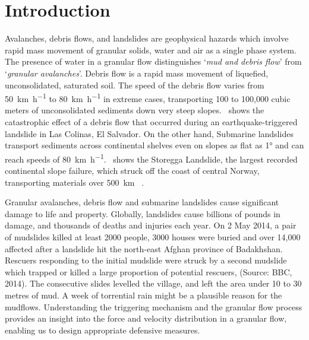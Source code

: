\chapter{Introduction}

\ifpdf
    \graphicspath{{Chapter1/figs/raster/}{Chapter1/figs/pdf/}{Chapter1/figs/}}
\else
    \graphicspath{{Chapter1/figs/vector/}{Chapter1/figs/}}
\fi

Avalanches, debris flows, and landslides are geophysical hazards which involve 
rapid mass movement of granular solids, water and air as a single phase system. 
The presence of water in a granular flow distinguishes `\textit{mud and debris 
flow}' from `\textit{granular avalanches}'. Debris flow is a rapid mass 
movement of liquefied, unconsolidated, saturated soil. The speed of the debris 
flow varies from 50~\si{\km\per\hour} to 80~\si{\km\per\hour} in extreme cases, 
transporting 100 to 100,000 cubic meters of unconsolidated sediments down very 
steep slopes.~ shows the catastrophic effect of a debris flow 
that occurred during an earthquake-triggered landslide in Las Colinas,  El 
Salvador. On the other hand, Submarine landslides transport sediments across 
continental shelves even on slopes as flat as 1\si{\degree} and can reach 
speeds of 80~\si{\km\per\hour}.~ shows the Storegga 
Landslide, the largest recorded continental slope failure, which struck off the 
coast of central Norway, transporting materials over 500~\si{\km} 
~\citep{Ward2002}. 

Granular avalanches, debris flow and submarine landslides cause significant 
damage to life and property. Globally, landslides cause billions of pounds in 
damage, and thousands of deaths and injuries each year. On 2 May 2014, a pair 
of mudslides killed at least 2000 people, 3000 houses were buried and over 
14,000 affected after a landslide hit the north-east Afghan province of 
Badakhshan. Rescuers responding to the initial mudslide were struck by a second 
mudslide which trapped or killed a large proportion of potential rescuers, 
(Source: BBC, 2014). The consecutive slides levelled the village, and left the 
area under 10 to 30 metres of mud. A week of torrential rain might be a 
plausible reason for the mudflows. Understanding the triggering mechanism and 
the granular flow process provides an insight into the force and velocity 
distribution in a granular flow, enabling us to design appropriate defensive 
measures. 

